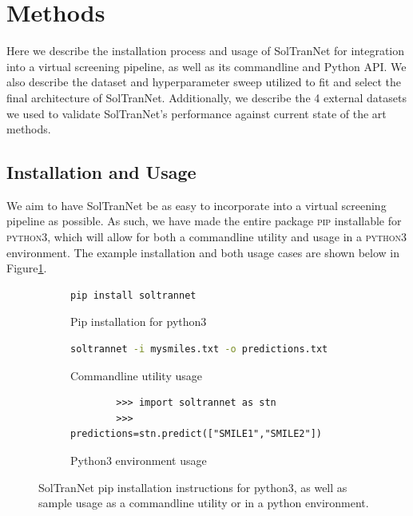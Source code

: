 \documentclass[journal=jmcmar,manuscript=article]{achemso}
\begin{document}
\section{Methods}

Here we describe the installation process and usage of SolTranNet for integration into a virtual screening pipeline, as well as its commandline and Python API.
We also describe the dataset and hyperparameter sweep utilized to fit and select the final architecture of SolTranNet.
Additionally, we describe the 4 external datasets we used to validate SolTranNet's performance against current state of the art methods.

\subsection{Installation and Usage}
We aim to have SolTranNet be as easy to incorporate into a virtual screening pipeline as possible.
As such, we have made the entire package \textsc{\textsc{pip}} installable for \textsc{python3}, which will allow for both a commandline utility and usage in a \textsc{python3} environment. The example installation and both usage cases are shown below in Figure\ref{fig:sampleusage}.

\begin{figure}
    \centering
    \begin{subfigure}[t]{0.75\textwidth}
        \centering
        \begin{lstlisting}[frame=none,language=bash]
 pip install soltrannet
        \end{lstlisting}
        \caption{Pip installation for python3}
    \end{subfigure}
    
    \begin{subfigure}[t]{0.75\textwidth}
        \centering
        \begin{lstlisting}[frame=none,language=bash]
soltrannet -i mysmiles.txt -o predictions.txt
        \end{lstlisting}
        \caption{Commandline utility usage}
    \end{subfigure}
    
    \begin{subfigure}[t]{0.75\textwidth}
        \centering
        \begin{verbatim}
        >>> import soltrannet as stn
        >>> predictions=stn.predict(["SMILE1","SMILE2"])
        \end{verbatim}
        \caption{Python3 environment usage}
    \end{subfigure}
    
    \caption{SolTranNet pip installation instructions for python3, as well as sample usage as a commandline utility or in a python environment.}
    \label{fig:sampleusage}
\end{figure}
\end{document}
